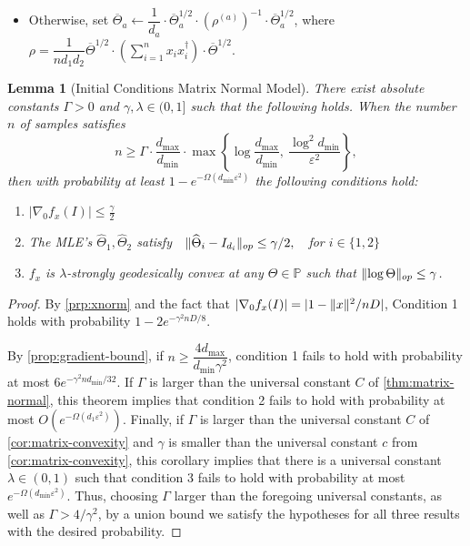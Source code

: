 \documentclass[aos]{imsart}
\newtheorem{lemma}[theorem]{Lemma}
\theoremstyle{definition}
\numberwithin{equation}{section}
\DeclarePairedDelimiter{\norm}{\lVert}{\rVert}
\newcommand{\otheta}{\overline{\Theta}}
\newcommand{\htheta}{\widehat{\Theta}}
\newcommand{\SPD}{\mathbb{P}}
\def\dmin{d_{\min}}
\def\dmax{d_{\max}}
\begin{document}
\begin{Algorithm}
\begin{enumerate}
\begin{itemize}
\vspace{5pt}

\item Otherwise, set $\otheta_a \leftarrow \dfrac{1}{d_a} \cdot \otheta_a^{1/2} \cdot (\rho^{(a)})^{-1} \cdot \otheta_a^{1/2}$, where $\rho = \dfrac{1}{n d_1 d_2} \otheta^{1/2} \cdot \left( \sum_{i=1}^n x_i x_i^\dagger \right) \cdot \otheta^{1/2}$.
\end{itemize}
\end{enumerate}
\caption{Matrix flip-flop algorithm}\label{alg:flip-flop matrix}
\end{Algorithm}

\begin{lemma}[Initial Conditions Matrix Normal Model]\label{lem:matrix-normal-initial-conditions}
There exist absolute constants $\Gamma > 0$ and $\gamma, \lambda \in (0,1]$ such that the following holds.
	When the number $n$ of samples satisfies 
	$$n \geq \Gamma \cdot \dfrac{\dmax}{\dmin} \cdot \max\left\{ \log \dfrac{\dmax}{\dmin}, \ \dfrac{\log^2 \dmin}{\varepsilon^2}  \right\},$$ 
	then with probability at least $1 - e^{- \Omega(\dmin \varepsilon^2)}$ the following conditions hold:
	\begin{enumerate}
		\item $|\nabla_0 f_x(I)| \leq \frac{\gamma}{2}$
		\item The MLE's $\htheta_1, \htheta_2$ satisfy $\ \ \norm{\htheta_i - I_{d_i}}_{op} \leq \gamma/2, \ \ $ for $i \in \{1,2\}$
		\item $f_x$ is $\lambda$-strongly geodesically convex at any $\Theta \in \SPD$ such that $\norm{\log \Theta}_{op} \leq \gamma$.
	\end{enumerate}
\end{lemma}

\begin{proof}
By \cref{prp:xnorm} and the fact that $|\nabla_0 f_x(I)| = |1 - \norm{x}^2/nD|$, Condition 1 holds with probability $1 - 2e^{-\gamma^2 nD/8}$. 

By \cref{prop:gradient-bound}, if $n \geq \dfrac{4\dmax}{\dmin \gamma^2}$, condition 1 fails to hold with probability at most $6e^{-\gamma^2n\dmin/32}$.
If $\Gamma$ is larger than the universal constant $C$ of \cref{thm:matrix-normal}, this theorem implies that condition 2 fails to hold with probability at most $O(e^{-\Omega(d_1 \varepsilon^2)})$. 
Finally, if $\Gamma$ is larger than the universal constant $C$ of \cref{cor:matrix-convexity} and $\gamma$ is smaller than the universal constant $c$ from \cref{cor:matrix-convexity}, this corollary implies that there is a universal constant $\lambda \in (0,1)$ such that condition 3 fails to hold with probability at most $e^{-\Omega(\dmin \varepsilon^2)}$. 
Thus, choosing $\Gamma$ larger than the foregoing universal constants, as well as $\Gamma > 4/\gamma^2$, by a union bound we satisfy the hypotheses for all three results with the desired probability. 
\end{proof}
\end{document}
